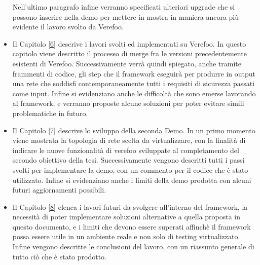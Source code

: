 \begin{itemize}
          Nell'ultimo paragrafo infine verranno specificati ulteriori upgrade che si possono inserire nella demo per mettere in mostra in maniera ancora più evidente il lavoro svolto da Verefoo.
    \item Il Capitolo \hyperref[ch:intro]{[6]} descrive i lavori svolti ed implementati su Verefoo. In questo capitolo viene descritto il processo di merge fra le versioni precedentemente esistenti di Verefoo.
          Successivamente verrà quindi spiegato, anche tramite frammenti di codice, gli step
          che il framework eseguirà per produrre in output una rete che soddisfi contemporaneamente tutti i requisiti di sicurezza passati come input.  
          Infine si evidenziano anche le difficoltà che sono emerse lavorando al framework, e verranno proposte alcune soluzioni per poter evitare simili problematiche in futuro.
    \item Il Capitolo \hyperref[ch:intro]{[7]} descrive lo sviluppo della seconda Demo. In un primo momento viene mostrata la topologia
        di rete scelta da virtualizzare, con la finalità di indicare le nuove funzionalità di verefoo sviluppate al completamento del secondo obiettivo della tesi. Successivamente vengono descritti tutti i passi svolti per implementare la demo, con un commento per il codice che è stato utilizzato. Infine
        si evidenziano anche i limiti della demo prodotta con alcuni  futuri aggiornamenti possibili.
    \item Il Capitolo \hyperref[ch:conclusions]{[8]} elenca i lavori futuri da svolgere all'interno del framework, la necessità di poter implementare soluzioni
          alternative a quella proposta in questo documento, e i limiti che devono essere superati affinchè il framework possa essere utile in un ambiente reale e non
          solo di testing virtualizzato. Infine vengono descritte le conclusioni del lavoro, con un riassunto generale di tutto ciò che è stato prodotto.
\end{itemize}
